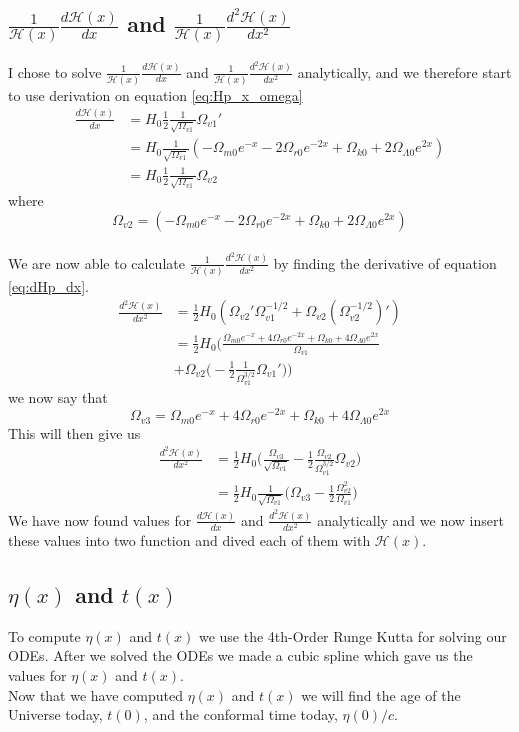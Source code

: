 \documentclass{article}
\begin{document}
\begin{multicols}{2}
\subsection{$\frac{1}{\mathcal{H}(x)}\frac{d\mathcal{H}(x)}{dx}$ and $\frac{1}{\mathcal{H}(x)}\frac{d^2\mathcal{H}(x)}{dx^2}$}
I chose to solve $\frac{1}{\mathcal{H}(x)}\frac{d\mathcal{H}(x)}{dx}$ and $\frac{1}{\mathcal{H}(x)}\frac{d^2\mathcal{H}(x)}{dx^2}$ analytically, and we therefore start to use derivation on equation \eqref{eq:Hp_x_omega}
\begin{align}
    \frac{d\mathcal{H}(x)}{dx}&=H_0\frac{1}{2}\frac{1}{\sqrt{\Omega_{v1}}}\Omega_{v1}'\\
    &=H_0\frac{1}{\sqrt{\Omega_{v1}}}(-\Omega_{m0}e^{-x}-2\Omega_{r0}e^{-2x}+\Omega_{k0}+2\Omega_{\Lambda0}e^{2x})\\
    &=H_0\frac{1}{2}\frac{1}{\sqrt{\Omega_{v1}}}\Omega_{v2} \label{eq:dHp_dx}
\end{align}
where $$\Omega_{v2}=(-\Omega_{m0}e^{-x}-2\Omega_{r0}e^{-2x}+\Omega_{k0}+2\Omega_{\Lambda0}e^{2x})$$\\
We are now able to calculate $\frac{1}{\mathcal{H}(x)}\frac{d^2\mathcal{H}(x)}{dx^2}$ by finding the derivative of equation \eqref{eq:dHp_dx}.
\begin{align}
   \frac{d^2\mathcal{H}(x)}{dx^2}&=\frac{1}{2}H_0(\Omega_{v2}'\Omega_{v1}^{-1/2}+\Omega_{v2}(\Omega_{v2}^{-1/2})' )\\
   &=\frac{1}{2}H_0\bigg(\frac{\Omega_{m0}e^{-x}+4\Omega_{r0}e^{-2x}+\Omega_{k0}+4\Omega_{\Lambda0}e^{2x}}{\Omega_{v1}}\nonumber\\&+\Omega_{v2}\bigg(-\frac{1}{2}\frac{1}{\Omega_{v1}^{3/2}}\Omega_{v1}'\bigg)\bigg)
\end{align}
we now say that $$\Omega_{v3}=\Omega_{m0}e^{-x}+4\Omega_{r0}e^{-2x}+\Omega_{k0}+4\Omega_{\Lambda0}e^{2x}$$ 
This will then give us
\begin{align}
    \frac{d^2\mathcal{H}(x)}{dx^2}&=\frac{1}{2}H_0\bigg(\frac{\Omega_{v3}}{\sqrt{\Omega_{v1}}}-\frac{1}{2}\frac{\Omega_{v2}}{{\Omega_{v1}^{3/2}}}\Omega_{v2}\bigg)\\
    &=\frac{1}{2}H_0\frac{1}{\sqrt{\Omega_{v1}}}\bigg(\Omega_{v3}-\frac{1}{2}\frac{\Omega_{v2}^2}{\Omega_{v1}}\bigg)
\end{align}
We have now found values for $\frac{d\mathcal{H}(x)}{dx}$ and $\frac{d^2\mathcal{H}(x)}{dx^2}$ analytically and we now insert these values into two function and dived each of them with $\mathcal{H}(x)$.\\
\subsection{$\eta(x)$ and $t(x)$}
To compute $\eta(x)$ and $t(x)$ we use the 4th-Order Runge Kutta for solving our ODEs. After we solved the ODEs we made a cubic spline which gave us the values for $\eta(x)$ and $t(x)$.\\
Now that we have computed $\eta(x)$ and $t(x)$ we will find the age of the Universe today, $t(0)$, and the conformal time today, $\eta(0)/c$.

\end{multicols}
\end{document}
